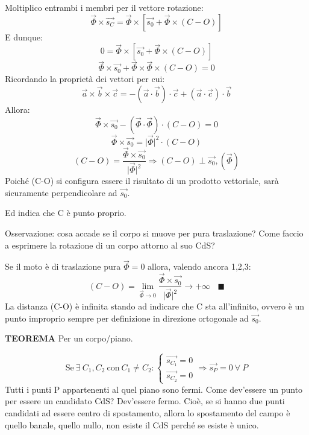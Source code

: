 \documentclass{article}
\begin{document}
\begin{adjustwidth}{2in}{}
Moltiplico entrambi i membri per il vettore rotazione:
\[
\vec{\Phi} \times \vec{s_C} =\vec{\Phi} \times \left[ \vec{s_0} + \vec{\Phi} \times (C-O)\right] 
\]
E dunque:
\[
0 =\vec{\Phi} \times \left[ \vec{s_0} + \vec{\Phi} \times (C-O)\right] 
\]	
\[
\vec{\Phi} \times \vec{s_0} + \vec{\Phi} \times \vec{\Phi} \times (C-O) = 0
\]		
Ricordando la proprietà dei vettori per cui: 
\[
\vec{a} \times \vec{b} \times \vec{c} = -(\vec{a} \cdot \vec{b}) \cdot \vec{c} + (\vec{a} \cdot \vec{c}) \cdot \vec{b}
\]		
Allora: 
\[
\vec{\Phi} \times \vec{s_0} - (\vec{\Phi} \cdot \vec{\Phi}) \cdot (C-O) = 0
\]		
\[
\vec{\Phi} \times \vec{s_0} = \vert\vec{\Phi}\vert^2  \cdot (C-O) 
\]	
\[
(C-O) = \frac{\vec{\Phi} \times \vec{s_0}}{\vert\vec{\Phi}\vert^2} \Rightarrow (C-O) \perp \vec{s_0}, (\vec{\Phi} )
\]
Poiché (C-O) si configura essere il risultato di un prodotto vettoriale, sarà sicuramente perpendicolare ad $\vec{s_0}$.

Ed indica che C è punto proprio. \newline

Osservazione: cosa accade se il corpo si muove per pura traslazione? Come faccio a esprimere la rotazione di un corpo attorno al suo CdS? \newline

Se il moto è di traslazione pura $\vec{\Phi} = 0$ allora, valendo ancora 1,2,3:
\[
(C-O) = \lim\limits_{\vec{\Phi} \rightarrow 0} \frac{\vec{\Phi} \times \vec{s_0}}{\vert\vec{\Phi}\vert^2} \rightarrow +\infty
 ~~~~ \blacksquare\]
La distanza (C-O) è infinita stando ad indicare che C sta all'infinito, ovvero è un punto improprio sempre per definizione in direzione ortogonale ad $\vec{s_0}$. \newline

\textbf{TEOREMA} \newline
Per un corpo/piano.

\[
\text{Se} ~ \exists ~ C_1,C_2 ~ \text{con} ~ C_1 \ne C_2 : \begin{cases}
\vec{s_{C_1}} = 0 \\
\vec{s_{C_2}} = 0
\end{cases} \Rightarrow \vec{s_P} = 0 ~ \forall ~ P 
\]
Tutti i punti P appartenenti al quel piano sono fermi.
Come dev'essere un punto per essere un candidato CdS? Dev'essere fermo. 
Cioè, se si hanno due punti candidati ad essere centro di spostamento, allora lo spostamento del campo è quello banale, quello nullo, non esiste il CdS perché se esiste è unico. \newline


\end{adjustwidth}
\end{document}

